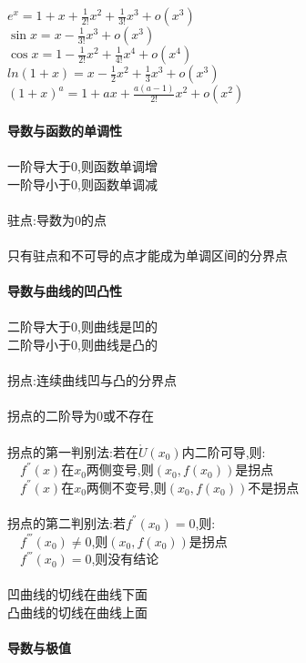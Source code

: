 \documentclass{article}
\begin{document}
\begin{flushleft}
	$e^x=1+x+\frac{1}{2!}x^2+\frac{1}{3!}x^3+o(x^3)$\\
	$\sin x=x-\frac{1}{3!}x^3+o(x^3)$\\
	$\cos x=1-\frac{1}{2!}x^2+\frac{1}{4!}x^4+o(x^4)$\\
	$ln(1+x)=x-\frac{1}{2}x^2+\frac{1}{3}x^3+o(x^3)$\\
	$(1+x)^a=1+ax+\frac{a(a-1)}{2!}x^2+o(x^2)$\\
	
	~\\ \textbf{导数与函数的单调性} \\~\\
	
	一阶导大于0,则函数单调增\\
	一阶导小于0,则函数单调减\\
	~\\
	驻点:导数为0的点\\
	~\\
	只有驻点和不可导的点才能成为单调区间的分界点\\
	
	~\\ \textbf{导数与曲线的凹凸性} \\~\\
	
	二阶导大于0,则曲线是凹的\\
	二阶导小于0,则曲线是凸的\\
	~\\
	拐点:连续曲线凹与凸的分界点\\
	~\\
	拐点的二阶导为0或不存在\\
	~\\
	拐点的第一判别法:若在$\mathring{U}(x_0)$内二阶可导,则:\\
	\ \ $f^{''}(x)$在$x_0$两侧变号,则$(x_0,f(x_0))$是拐点\\
	\ \ $f^{''}(x)$在$x_0$两侧不变号,则$(x_0,f(x_0))$不是拐点\\
	~\\
	拐点的第二判别法:若$f^{''}(x_0)=0$,则:\\
	\ \ $f^{'''}(x_0)\neq 0$,则$(x_0,f(x_0))$是拐点\\
	\ \ $f^{'''}(x_0)=0$,则没有结论\\
	~\\
	凹曲线的切线在曲线下面\\
	凸曲线的切线在曲线上面\\
	
	~\\ \textbf{导数与极值} \\~\\
	

\end{flushleft}
\end{document}
